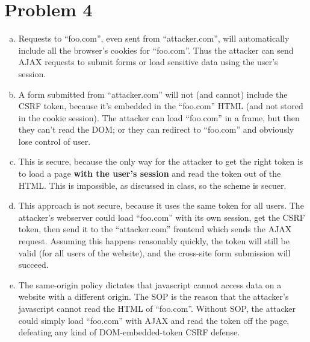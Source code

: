 \documentclass{article}
\begin{document}
\section*{Problem 4}
\begin{enumerate}[(a)]
\item Requests to ``foo.com'', even sent from ``attacker.com'', will automatically include all the browser's cookies for ``foo.com''. Thus the attacker can send AJAX requests to submit forms or load sensitive data using the user's session.
\item A form submitted from ``attacker.com'' will not (and cannot) include the CSRF token, because it's embedded in the ``foo.com'' HTML (and not stored in the cookie session). The attacker can load ``foo.com'' in a frame, but then they can't read the DOM; or they can redirect to ``foo.com'' and obviously lose control of user.
\item This is secure, because the only way for the attacker to get the right token is to load a page \textbf{with the user's session} and read the token out of the HTML. This is impossible, as discussed in class, so the scheme is secuer.
\item This approach is not secure, because it uses the same token for all users. The attacker's webserver could load ``foo.com'' with its own session, get the CSRF token, then send it to the ``attacker.com'' frontend which sends the AJAX request. Assuming this happens reasonably quickly, the token will still be valid (for all users of the website), and the cross-site form submission will succeed.
\item The same-origin policy dictates that javascript cannot access data on a website with a different origin. The SOP is the reason that the attacker's javascript cannot read the HTML of ``foo.com''. Without SOP, the attacker could simply load ``foo.com'' with AJAX and read the token off the page, defeating any kind of DOM-embedded-token CSRF defense.
\end{enumerate}
\end{document}
